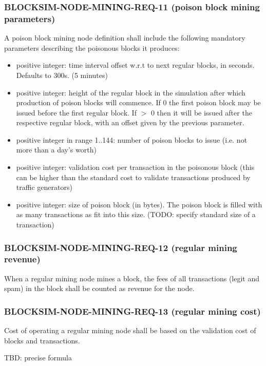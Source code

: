 \documentclass{scrreprt}
\begin{document}
\subsubsection{BLOCKSIM-NODE-MINING-REQ-11 (poison block mining parameters)}

A poison block mining node definition shall include the following mandatory
parameters describing the poisonous blocks it produces:

\begin{itemize}
   \item positive integer: time interval offset w.r.t to next regular blocks, in seconds. Defaults to 300s. (5 minutes)
   \item positive integer: height of the regular block in the simulation after which production of poison blocks will commence. If 0 the first poison block may be issued before the first regular block. If $>$ 0 then it will be issued after the respective regular block, with an offset given by the previous parameter.
   \item positive integer in range 1..144: number of poison blocks to issue (i.e. not more than a day's worth)
   \item positive integer: validation cost per transaction in the poisonous block (this can be higher than the standard cost to validate transactions produced by traffic generators)
   \item positive integer: size of poison block (in bytes). The poison block is filled with as many transactions as fit into this size. (TODO: specify standard size of a transaction)
\end{itemize}

\subsubsection{BLOCKSIM-NODE-MINING-REQ-12 (regular mining revenue)}

When a regular mining node mines a block, the fees of all transactions
(legit and spam) in the block shall be counted as revenue for the node.

\subsubsection{BLOCKSIM-NODE-MINING-REQ-13 (regular mining cost)}

Cost of operating a regular mining node shall be based on the validation
cost of blocks and transactions.

TBD: precise formula
\end{document}
